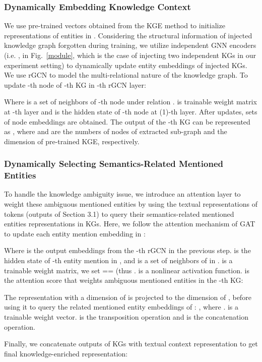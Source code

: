 \documentclass{article} \usepackage{iclr2022_conference,times}
\begin{document}
\subsubsection{Dynamically Embedding Knowledge Context}
We use pre-trained vectors obtained from the KGE method to initialize representations of entities in . Considering the structural information of injected knowledge graph forgotten during training, we utilize  independent GNN encoders (i.e. ,  in Fig.~\ref{module}, which is the case of injecting two independent KGs in our experiment setting) to dynamically update entity embeddings of  injected KGs. We use rGCN to model the multi-relational nature of the knowledge graph. To update -th node of -th KG in -th rGCN layer:


Where  is a set of neighbors of -th node under relation .  is trainable weight matrix at -th layer and  is the hidden state of -th node at (1)-th layer.
After  updates,  sets of node embeddings are obtained. The output of the -th KG can be represented as , where  and  are the numbers of nodes of extracted sub-graph and the dimension of pre-trained KGE, respectively.

\subsubsection{Dynamically Selecting Semantics-Related Mentioned Entities}
To handle the knowledge ambiguity issue, we introduce an attention layer to weight these ambiguous mentioned entities by using the textual representations of tokens (outputs of Section 3.1) to query their semantics-related mentioned entities representations in KGs. Here, we follow the attention mechanism of GAT to update each entity mention embedding in : 

\noindent Where  is the output embeddings from the -th rGCN in the previous step.  is the hidden state of -th entity mention  in , and  is a set of neighbors of  in .  is a trainable weight matrix, we set == (thus .  is a nonlinear activation function.  is the attention score that weights ambiguous mentioned entities in the -th KG:



\noindent The representation  with a dimension of  is projected to the dimension of , before using it to query the related mentioned entity embeddings of : , where .  is a trainable weight vector.  is the transposition operation and  is the concatenation operation.

Finally, we concatenate outputs of  KGs with textual context representation to get final knowledge-enriched representation:
\end{document}
